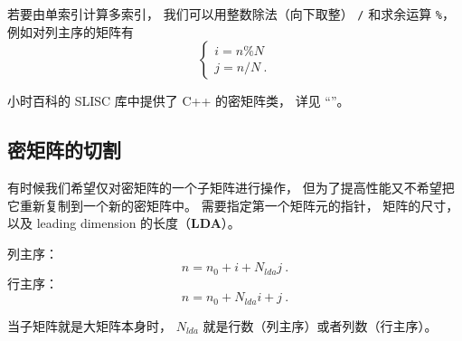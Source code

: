若要由单索引计算多索引， 我们可以用整数除法（向下取整） \verb`/` 和求余运算 \verb`%`， 例如对列主序的矩阵有
\begin{equation}
\begin{cases}
i = n \% N\\
j = n / N~.
\end{cases}
\end{equation}

小时百科的 SLISC 库中提供了 C++ 的密矩阵类， 详见 “”。

\subsection{密矩阵的切割}
有时候我们希望仅对密矩阵的一个子矩阵进行操作， 但为了提高性能又不希望把它重新复制到一个新的密矩阵中。
需要指定第一个矩阵元的指针， 矩阵的尺寸， 以及 leading dimension 的长度（\textbf{LDA}）。

列主序： 
\begin{equation}
n = n_0 + i + N_{lda} j~.
\end{equation}
行主序：
\begin{equation}
n = n_0 + N_{lda} i + j~.
\end{equation}

当子矩阵就是大矩阵本身时， $N_{lda}$ 就是行数（列主序）或者列数（行主序）。
